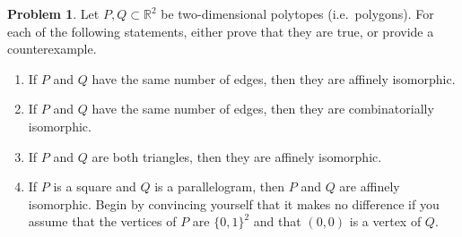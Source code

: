 \documentclass[letterpaper,11pt]{amsart}
\theoremstyle{plain}
\theoremstyle{definition}
\newtheorem{pr}{Problem}
\theoremstyle{remark}
\begin{document}
\vspace{.5cm}


\begin{pr}
    Let $P,Q \subset \mathbb{R}^2$ be two-dimensional polytopes (i.e.~polygons).
    For each of the following statements, either prove that they are true, or provide a counterexample.
    \begin{enumerate}
        \item If $P$ and $Q$ have the same number of edges, then they are affinely isomorphic.
        \item If $P$ and $Q$ have the same number of edges, then they are combinatorially isomorphic.
        \item If $P$ and $Q$ are both triangles, then they are affinely isomorphic.
        \item If $P$ is a square and $Q$ is a parallelogram, then $P$ and $Q$ are affinely isomorphic.
        Begin by convincing yourself that it makes no difference if you assume that the vertices of $P$ are $\{0,1\}^2$ and that
        $(0,0)$ is a vertex of $Q$.
    \end{enumerate}
\end{pr}
\end{document}
